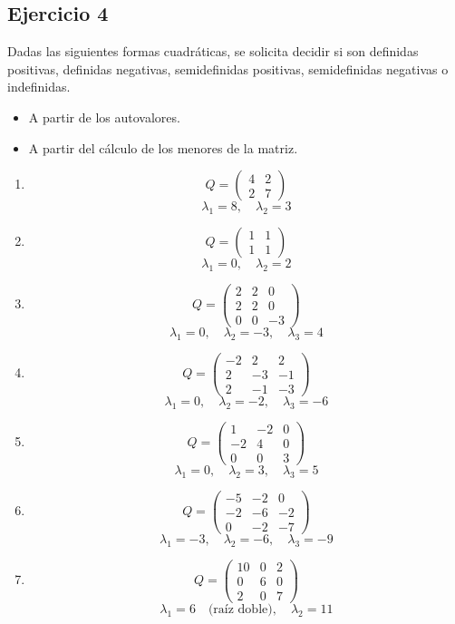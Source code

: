 \documentclass{article}
\begin{document}
\newpage
\subsection{Ejercicio 4}


Dadas las siguientes formas cuadráticas, se solicita decidir si son definidas positivas, definidas negativas, semidefinidas positivas, semidefinidas negativas o indefinidas.
    \begin{itemize}
        \item A partir de los autovalores.
        \item A partir del cálculo de los menores de la matriz.
    \end{itemize}

\begin{enumerate}
    \item 
\[
Q = \begin{pmatrix} 4 & 2 \\ 2 & 7 \end{pmatrix}
\]
\[
\lambda_1 = 8, \quad \lambda_2 = 3
\]
 \item 
 
\[
Q = \begin{pmatrix} 1 & 1 \\ 1 & 1 \end{pmatrix}
\]
\[
\lambda_1 = 0, \quad \lambda_2 = 2
\]
 \item 
\[
Q = \begin{pmatrix} 2 & 2 & 0 \\ 2 & 2 & 0 \\ 0 & 0 & -3 \end{pmatrix}
\]
\[
\lambda_1 = 0, \quad \lambda_2 = -3, \quad \lambda_3 = 4
\]
 \item 
\[
Q=
\begin{pmatrix}
-2 & 2 & 2\\[4pt]
2  & -3& -1\\[4pt]
2  & -1& -3
\end{pmatrix}
\]
\[
\lambda_1 = 0, \quad \lambda_2 = -2, \quad \lambda_3 = -6
\]
 \item 
\[
Q=
\begin{pmatrix}
1  & -2 & 0\\[4pt]
-2 &  4 & 0\\[4pt]
0  &  0 & 3
\end{pmatrix}
\]
\[
\lambda_1 = 0, \quad \lambda_2 = 3, \quad \lambda_3 = 5
\]
 \item 
\[
Q =
\begin{pmatrix}
-5 & -2 & 0\\[4pt]
-2 & -6 & -2\\[4pt]
0  & -2 & -7
\end{pmatrix}
\]
\[
\lambda_1 = -3, \quad \lambda_2 = -6, \quad \lambda_3 = -9
\]
 \item 
\[
Q=
\begin{pmatrix}
10 & 0 & 2\\[4pt]
0  & 6 & 0\\[4pt]
2  & 0 & 7
\end{pmatrix}
\]
\[
\lambda_1 = 6 \quad \text{(raíz doble)}, \quad \lambda_2 = 11
\]
\end{enumerate}
\end{document}
